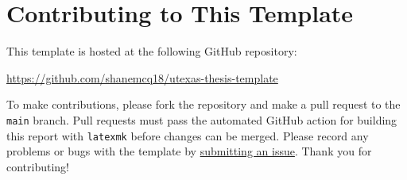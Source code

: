 \chapter{Contributing to This Template}

This template is hosted at the following GitHub repository:
\begin{center}
    \url{https://github.com/shanemcq18/utexas-thesis-template}
\end{center}
To make contributions, please fork the repository and make a pull request to the \texttt{main} branch.
Pull requests must pass the automated GitHub action for building this report with \texttt{latexmk} before changes can be merged.
Please record any problems or bugs with the template by \href{https://github.com/shanemcq18/utexas-thesis-template/issues/new/choose}{submitting an issue}.
Thank you for contributing!
